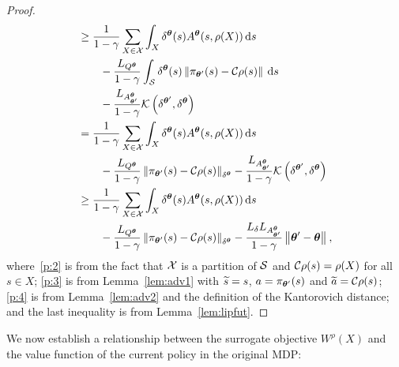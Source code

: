 \begin{proof}
\begin{align}
	&\geq  \frac{1}{1-\gamma}\sum_{X\in\Xspace}\int_{X}\delta^{\vtheta}(s)A^{\vtheta}(s,\rho(X))\de s \nonumber\\
	&\qquad	- \frac{L_{Q^{\vtheta}}}{1-\gamma}\int_{\Sspace}\delta^{\vtheta}(s)\norm{\pi_{\vtheta'}(s) - \Conc\rho(s)} \de s\nonumber\\
	& \qquad- \frac{L_{A^{\vtheta}_{\vtheta'}}}{1-\gamma}\Kant\left(\delta^{\vtheta'},\delta^{\vtheta}\right) \label{p:4}\\
	&=  \frac{1}{1-\gamma}\sum_{X\in\Xspace}\int_{X}\delta^{\vtheta}(s)A^{\vtheta}(s,\rho(X))\de s 
	\nonumber\\ 
	&\qquad - \frac{L_{Q^{\vtheta}}}{1-\gamma}\norm[\delta^{\vtheta}]{\pi_{\vtheta'}(s) - \Conc\rho(s)} -\frac{L_{A^{\vtheta}_{\vtheta'}}}{1-\gamma}\Kant\left(\delta^{\vtheta'},\delta^{\vtheta}\right) \nonumber\\
	&\geq  \frac{1}{1-\gamma}\sum_{X\in\Xspace}\int_{X}\delta^{\vtheta}(s)A^{\vtheta}(s,\rho(X))\de s \nonumber\\
	&\qquad - \frac{L_{Q^{\vtheta}}}{1-\gamma}\norm[\delta^{\vtheta}]{\pi_{\vtheta'}(s) - \Conc\rho(s)} -\frac{L_{\delta}L_{A^{\vtheta}_{\vtheta'}}}{1-\gamma}\norm{\vtheta'-\vtheta},\nonumber
	\end{align}
	where~\eqref{p:2} is from the fact that $\Xspace$ is a partition of $\Sspace$ and $\Conc\rho (s) = \rho(X)$ for all $s\in X$; \eqref{p:3} is from Lemma~\ref{lem:adv1} with $\wt{s}=s$, $a=\pi_{\vtheta'}(s)$ and $\wt{a}=\Conc\rho(s)$; \eqref{p:4} is from Lemma~\ref{lem:adv2} and the definition of the Kantorovich distance; and the last inequality is from Lemma~\ref{lem:lipfut}.
\end{proof}

\noindent We now establish a relationship between the surrogate objective $W^{\rho}(X)$ and the value function of the current policy in the original \ac{MDP}:

